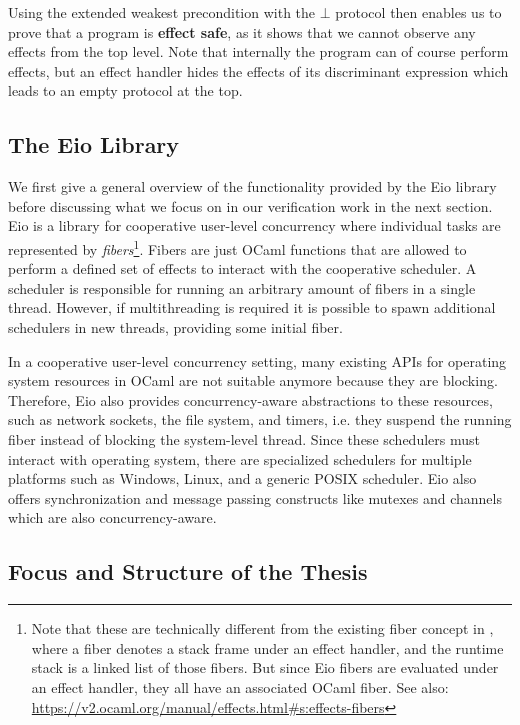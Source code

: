 Using the extended weakest precondition with the \(\bot\) protocol then enables us to prove that a program is \textbf{effect safe}, as it shows that we cannot observe any effects from the top level.
Note that internally the program can of course perform effects, but an effect handler hides the effects of its discriminant expression which leads to an empty protocol at the top.

\subsection{The Eio Library}
\label{sec:intro-eio}

We first give a general overview of the functionality provided by the Eio library before discussing what we focus on in our verification work in the next section.
Eio is a library for cooperative user-level concurrency where individual tasks are represented by \emph{fibers}\footnote{Note that these are technically different from the existing fiber concept in \ocf{}, where a fiber denotes a stack frame under an effect handler, and the runtime stack is a linked list of those fibers. But since Eio fibers are evaluated under an effect handler, they all have an associated OCaml fiber. See also: \url{https://v2.ocaml.org/manual/effects.html\#s:effects-fibers}}.
Fibers are just OCaml functions that are allowed to perform a defined set of effects to interact with the cooperative scheduler.
A scheduler is responsible for running an arbitrary amount of fibers in a single thread.
However, if multithreading is required it is possible to spawn additional schedulers in new threads, providing some initial fiber.

In a cooperative user-level concurrency setting, many existing APIs for operating system resources in OCaml are not suitable anymore because they are blocking.
Therefore, Eio also provides concurrency-aware abstractions to these resources, such as network sockets, the file system, and timers, i.e. they suspend the running fiber instead of blocking the system-level thread.
Since these schedulers must interact with operating system, there are specialized schedulers for multiple platforms such as Windows, Linux, and a generic POSIX scheduler.
Eio also offers synchronization and message passing constructs like mutexes and channels which are also concurrency-aware.

\subsection{Focus and Structure of the Thesis}
\label{sec:intro-structure}

